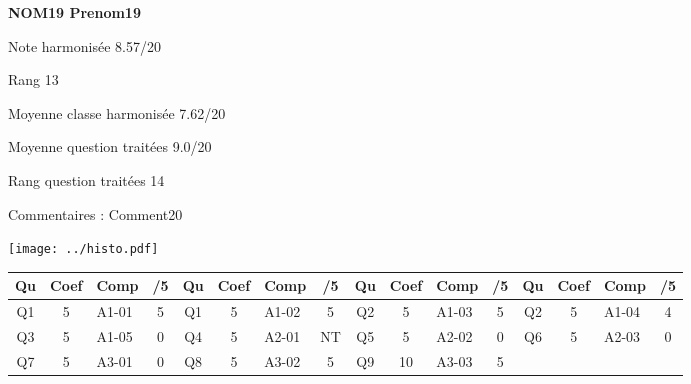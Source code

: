 \begin{minipage}[c]{.45\linewidth} 
\Large \textbf{\textsf{NOM19 Prenom19}} 
 
 \normalsize Note harmonisée 8.57/20 
 
Rang 13
 
Moyenne classe harmonisée 7.62/20 
 
Moyenne question traitées 9.0/20 
 
Rang question traitées 14 
 
Commentaires : 
Comment20 
\end{minipage}\hfill 
\begin{minipage}[c]{.45\linewidth}  
\begin{center}
\texttt{[image: ../histo.pdf]} 
\end{center}
\end{minipage}
\footnotesize 
\begin{center} 
\begin{tabular}{|c|c|m{1cm}|c||c|c|m{1cm}|c||c|c|m{1cm}|c||c|c|m{1cm}|c|} 
\hline \textbf{Qu} & \textbf{Coef} & \textbf{Comp} & \textbf{/5} & \textbf{Qu} & \textbf{Coef} & \textbf{Comp} & \textbf{/5} & \textbf{Qu} & \textbf{Coef} & \textbf{Comp} & \textbf{/5} & \textbf{Qu} & \textbf{Coef} & \textbf{Comp} & \textbf{/5} \\ 
\hline 
\hline 
Q1 & 5 & A1-01 & 5 & Q1 & 5 & A1-02 & 5 & Q2 & 5 & A1-03 & 5 & Q2 & 5 & A1-04 & 4 \\ \hline 
 
Q3 & 5 & A1-05 & 0 & Q4 & 5 & A2-01 & NT & Q5 & 5 & A2-02 & 0 & Q6 & 5 & A2-03 & 0 \\ \hline 
 

Q7 & 5 & A3-01 & 0 & Q8 & 5 & A3-02 & 5 & Q9 & 10 & A3-03 & 5 &  &  &  &  \\ \hline 
 
\end{tabular} 
\end{center} 
\normalsize 
 
